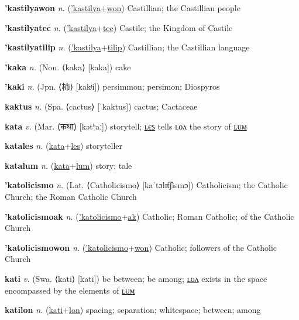 \textbf{\hypertarget{'kastilyawon}{'kastilyawon}} \textit{n.} (\hyperlink{'kastilya}{'kastilya}+\allowbreak \hyperlink{won}{won})
Castillian; the Castillian people

\textbf{\hypertarget{'kastilyatec}{'kastilyatec}} \textit{n.} (\hyperlink{'kastilya}{'kastilya}+\allowbreak \hyperlink{tec}{tec})
Castile; the Kingdom of Castile

\textbf{\hypertarget{'kastilyatilip}{'kastilyatilip}} \textit{n.} (\hyperlink{'kastilya}{'kastilya}+\allowbreak \hyperlink{tilip}{tilip})
Castillian; the Castillian language

\textbf{\hypertarget{'kaka}{'kaka}} \textit{n.} (Non. ⟨kaka⟩ [kaka])
cake

\textbf{\hypertarget{'kaki}{'kaki}} \textit{n.} (Jpn. ⟨{\japanese{}柿}⟩ [kakʲi])
persimmon; persimon; Diospyros

\textbf{\hypertarget{kaktus}{kaktus}} \textit{n.} (Spa. ⟨cactus⟩ [ˈkaktus])
cactus; Cactaceae

\textbf{\hypertarget{kata}{kata}} \textit{v.} (Mar. ⟨{\devanagari{}कथा}⟩ [kətʰaː])
storytell; \hyperlink{katales}{ʟєꜱ} tells ʟᴏᴧ the story of \hyperlink{katalum}{ʟᴜᴍ}

\textbf{\hypertarget{katales}{katales}} \textit{n.} (\hyperlink{kata}{kata}+\allowbreak \hyperlink{les}{les})
storyteller

\textbf{\hypertarget{katalum}{katalum}} \textit{n.} (\hyperlink{kata}{kata}+\allowbreak \hyperlink{lum}{lum})
story; tale

\textbf{\hypertarget{'katolicismo}{'katolicismo}} \textit{n.} (Lat. ⟨Catholicismo⟩ [kaˈtɔlɪt͡ʃismɔ])
Catholicism; the Catholic Church; the Roman Catholic Church

\textbf{\hypertarget{'katolicismoak}{'katolicismoak}} \textit{n.} (\hyperlink{'katolicismo}{'katolicismo}+\allowbreak \hyperlink{ak}{ak})
Catholic; Roman Catholic; of the Catholic Church

\textbf{\hypertarget{'katolicismowon}{'katolicismowon}} \textit{n.} (\hyperlink{'katolicismo}{'katolicismo}+\allowbreak \hyperlink{won}{won})
Catholic; followers of the Catholic Church

\textbf{\hypertarget{kati}{kati}} \textit{v.} (Swa. ⟨kati⟩ [kati])
be between; be among; \hyperlink{katilon}{ʟᴏᴧ} exists in the space encompassed by the elements of \hyperlink{katilum}{ʟᴜᴍ}

\textbf{\hypertarget{katilon}{katilon}} \textit{n.} (\hyperlink{kati}{kati}+\allowbreak \hyperlink{lon}{lon})
spacing; separation; whitespace; between; among

